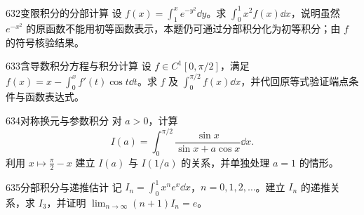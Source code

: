 \begin{exercise}{632}{变限积分的分部计算}
设 $f(x)=\int_1^xe^{-y^2}\dd y$。求 $\int_0^1x^2f(x)\dd x$，说明虽然 $e^{-x^2}$ 的原函数不能用初等函数表示，本题仍可通过分部积分化为初等积分；由 $f$ 的符号核验结果。
\end{exercise}
\begin{exercise}{633}{含导数积分方程与积分计算}
设 $f\in C^1[0,\pi/2]$，满足 $f(x)=x-\int_0^xf'(t)\cos t\dd t$。求 $f$ 及 $\int_0^{\pi/2}f(x)\dd x$，并代回原等式验证端点条件与函数表达式。
\end{exercise}
\begin{exercise}{634}{对称换元与参数积分}
对 $a>0$，计算
\[
I(a)=\int_0^{\pi/2}\frac{\sin x}{\sin x+a\cos x}\dd x.
\]
利用 $x\mapsto\frac\pi2-x$ 建立 $I(a)$ 与 $I(1/a)$ 的关系，并单独处理 $a=1$ 的情形。
\end{exercise}
\begin{exercise}{635}{分部积分与递推估计}
记 $I_n=\int_0^1x^ne^x\dd x$，$n=0,1,2,\ldots$。建立 $I_n$ 的递推关系，求 $I_3$，并证明 $\lim_{n\to\infty}(n+1)I_n=e$。
\end{exercise}
